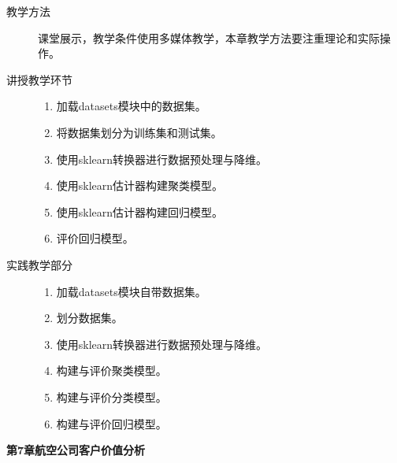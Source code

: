 \documentclass[12pt,a4paper,openany,cap]{ctexbook}
\begin{document}
\begin{description}
\item[教学方法]课堂展示，教学条件使用多媒体教学，本章教学方法要注重理论和实际操作。
\item[讲授教学环节]
  \begin{minipage}[t]{0.8\linewidth}
    \begin{enumerate}
    \item   加载datasets模块中的数据集。
\item\label{item:181}  将数据集划分为训练集和测试集。
\item\label{item:182}  使用sklearn转换器进行数据预处理与降维。
\item\label{item:183}  使用sklearn估计器构建聚类模型。
\item\label{item:187}  使用sklearn估计器构建回归模型。
\item\label{item:188}  评价回归模型。
    \end{enumerate}
  \end{minipage}

\item[实践教学部分]
  \begin{minipage}[t]{0.8\linewidth}
    \begin{enumerate}
    \item 加载datasets模块自带数据集。
\item\label{item:189}  划分数据集。
\item\label{item:190}  使用sklearn转换器进行数据预处理与降维。
\item\label{item:191}  构建与评价聚类模型。
\item\label{item:192}  构建与评价分类模型。
\item\label{item:193}  构建与评价回归模型。
    \end{enumerate}
  \end{minipage}

  
\end{description}

\begin{center}
   \textbf{第7章\quad 航空公司客户价值分析}
\end{center}
\end{document}
